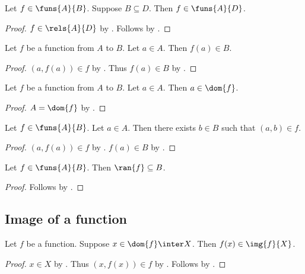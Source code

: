 \begin{proposition}\label{funs_weaken_codom}
    Let $f\in\funs{A}{B}$.
    Suppose $B\subseteq D$.
    Then $f\in\funs{A}{D}$.
\end{proposition}
\begin{proof}
    $f\in\rels{A}{D}$ by .
    Follows by .
\end{proof}

\begin{classification}\label{funs_type_apply}
    Let $f$ be a function from $A$ to $B$.
    Let $a\in A$.
    Then $f(a)\in B$.
\end{classification}
\begin{proof}
    $(a,f(a)) \in f$ by .
    Thus $f(a)\in B$ by .
\end{proof}

\begin{classification}\label{function_from_domain_consumer}
    Let $f$ be a function from $A$ to $B$.
    Let $a\in A$.
    Then $a\in\dom{f}$.
\end{classification}
\begin{proof}
    $A=\dom{f}$ by .
\end{proof}

\begin{proposition}\label{funs_tuple_intro}
    Let $f\in\funs{A}{B}$.
    Let $a\in A$.
    Then there exists $b\in B$ such that $(a,b)\in f$.
\end{proposition}
\begin{proof}
    $(a,f(a)) \in f$ by .
    $f(a)\in B$ by .
\end{proof}


\begin{proposition}\label{funs_ran}
    Let $f\in\funs{A}{B}$.
    Then $\ran{f}\subseteq B$.
\end{proposition}
\begin{proof}
    Follows by .
\end{proof}



\subsection{Image of a function}

\begin{proposition}\label{img_of_function_intro}
    Let $f$ be a function.
    Suppose $x\in\dom{f}\inter X$.
    Then $f(x)\in \img{f}{X}$.
\end{proposition}
\begin{proof}
    $x\in X$ by .
    Thus $(x,f(x))\in f$ by .
    Follows by .
\end{proof}

